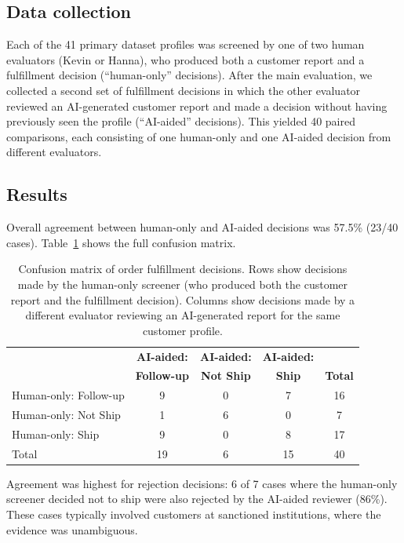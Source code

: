 \documentclass[utf8]{frontiers_suppmat}
\begin{document}
\subsection{Data collection}

Each of the 41 primary dataset profiles was screened by one of two human evaluators (Kevin or Hanna), who produced both a customer report and a fulfillment decision (``human-only'' decisions). After the main evaluation, we collected a second set of fulfillment decisions in which the other evaluator reviewed an AI-generated customer report and made a decision without having previously seen the profile (``AI-aided'' decisions). This yielded 40 paired comparisons, each consisting of one human-only and one AI-aided decision from different evaluators.

\subsection{Results}

Overall agreement between human-only and AI-aided decisions was 57.5\% (23/40 cases). Table~\ref{tab:fulfillment_matrix} shows the full confusion matrix.

\begin{table}[H]
\centering
\caption{Confusion matrix of order fulfillment decisions. Rows show decisions made by the human-only screener (who produced both the customer report and the fulfillment decision). Columns show decisions made by a different evaluator reviewing an AI-generated report for the same customer profile.}
\label{tab:fulfillment_matrix}
\begin{tabular}{lcccc}
\toprule
 & \textbf{AI-aided:} & \textbf{AI-aided:} & \textbf{AI-aided:} & \\
 & \textbf{Follow-up} & \textbf{Not Ship} & \textbf{Ship} & \textbf{Total} \\
\midrule
Human-only: Follow-up & 9 & 0 & 7 & 16 \\
Human-only: Not Ship & 1 & 6 & 0 & 7 \\
Human-only: Ship & 9 & 0 & 8 & 17 \\
\midrule
Total & 19 & 6 & 15 & 40 \\
\bottomrule
\end{tabular}
\end{table}

Agreement was highest for rejection decisions: 6 of 7 cases where the human-only screener decided not to ship were also rejected by the AI-aided reviewer (86\%). These cases typically involved customers at sanctioned institutions, where the evidence was unambiguous.
\end{document}
